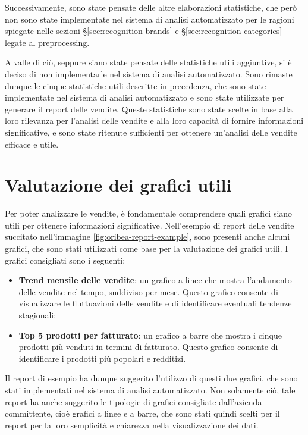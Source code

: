 Successivamente, sono state pensate delle altre elaborazioni statistiche, che però non sono state implementate nel sistema di analisi automatizzato per le ragioni spiegate nelle sezioni \S\ref{sec:recognition-brands} e \S\ref{sec:recognition-categories} legate al \gls{preprocessing}.

A valle di ciò, seppure siano state pensate delle statistiche utili aggiuntive, si è deciso di non implementarle nel sistema di analisi automatizzato. Sono rimaste dunque le cinque statistiche utili descritte in precedenza, che sono state implementate nel sistema di analisi automatizzato e sono state utilizzate per generare il report delle vendite. Queste statistiche sono state scelte in base alla loro rilevanza per l'analisi delle vendite e alla loro capacità di fornire informazioni significative, e sono state ritenute sufficienti per ottenere un'analisi delle vendite efficace e utile.



\section{Valutazione dei grafici utili}

Per poter analizzare le vendite, è fondamentale comprendere quali grafici siano utili per ottenere informazioni significative. Nell'esempio di report delle vendite succitato nell'immagine \ref{fig:oribea-report-example}, sono presenti anche alcuni grafici, che sono stati utilizzati come base per la valutazione dei grafici utili.
I grafici consigliati sono i seguenti:
\begin{itemize}
    \item \textbf{Trend mensile delle vendite}: un grafico a linee che mostra l'andamento delle vendite nel tempo, suddiviso per mese. Questo grafico consente di visualizzare le fluttuazioni delle vendite e di identificare eventuali tendenze stagionali;
    \item \textbf{Top 5 prodotti per fatturato}: un grafico a barre che mostra i cinque prodotti più venduti in termini di fatturato. Questo grafico consente di identificare i prodotti più popolari e redditizi.
\end{itemize}

Il report di esempio ha dunque suggerito l'utilizzo di questi due grafici, che sono stati implementati nel sistema di analisi automatizzato. Non solamente ciò, tale report ha anche suggerito le tipologie di grafici consigliate dall'azienda committente, cioè grafici a linee e a barre, che sono stati quindi scelti per il report per la loro semplicità e chiarezza nella visualizzazione dei dati.

